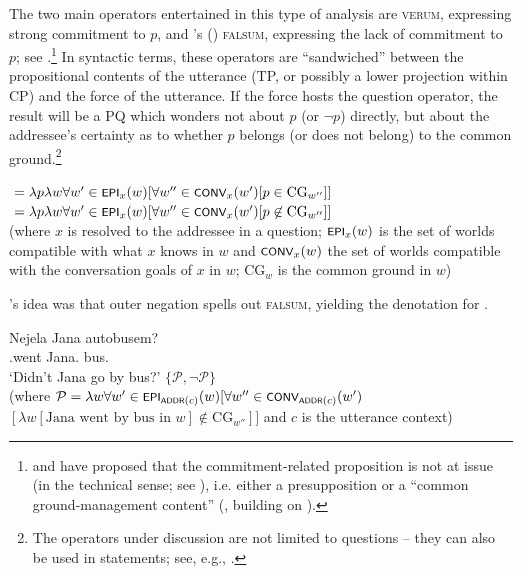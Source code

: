 \documentclass[output=paper,colorlinks,citecolor=brown]{langscibook}
\begin{document}
The two main operators entertained in this type of analysis are  \textsc{verum}, expressing strong commitment to $p$, and \citeauthor{Repp2006}'s (\citeyear{Repp2006,Repp2009,Repp2013}) \textsc{falsum}, expressing the lack of commitment to $p$; see .\footnote{\citet{Romero2015} and \citet{Frana.Rawlins2019} have proposed that the commitment-related proposition is not at issue (in the technical sense; see \citealt{Simons.etal2011}), i.e. either a presupposition \citep{Frana.Rawlins2019} or a ``common ground-management content'' (\citealt{Romero2015}, building on \citealt{Repp2013}).} In syntactic terms, these operators are ``sandwiched'' between the propositional contents of the utterance (TP, or possibly a lower projection within CP) and the force of the utterance. If the force hosts the question operator, the result will be a PQ which wonders not about $p$ (or $\neg p$) directly, but about the addressee's certainty as to whether $p$ belongs (or does not belong) to the common ground.\footnote{The operators under discussion are not limited to questions -- they can also be used in statements; see, e.g., \citet{Gutzmann.Castroviejomiro2011,Romero2015}.}

\ea\label{sim:denot:verum-falsum}
\ea {}${}=\lambda p\lambda w\forall w'\in\cnst{epi}_x(w)[\forall w''\in\cnst{conv}_x(w')[p\in\text{CG}_{w''}]]$
\ex {}${}=\lambda p\lambda w\forall w'\in\cnst{epi}_x(w)[\forall w''\in\cnst{conv}_x(w')[p\not\in\text{CG}_{w''}]]$\smallskip\\
(where $x$ is resolved to the addressee in a question; $\cnst{epi}_x(w)$ is the set of worlds compatible with what $x$ knows in $w$ and $\cnst{conv}_x(w)$ the set of worlds compatible with the conversation goals of $x$ in $w$; $\text{CG}_w$ is the common ground in $w$)
\z\z

\noindent \citeauthor{Repp2006}'s idea was that outer negation spells out \textsc{falsum}, yielding the denotation  for .

\ea\ea\gll Nejela Jana autobusem?\label{sim:ex:hnq-repp}\\
{\NEG}.went Jana.{\NOM} bus.{\INS}\\
\glt `Didn't Jana go by bus?'
\ex $\{\mathcal{P},\neg\mathcal{P}\}$\label{sim:denot:hnq-repp}\\
(where $\mathcal{P}=\lambda w\forall w'\in\cnst{epi}_{\cnst{addr}(c)}(w)[\forall w''\in\cnst{conv}_{\cnst{addr}(c)}(w')$\\$[\lambda w[\text{Jana went by bus in }w]\not\in\text{CG}_{w''}]]$ and $c$ is the utterance context)
\z\z
\end{document}
